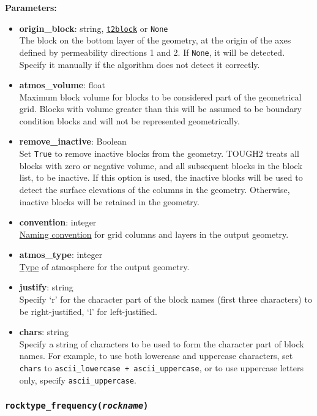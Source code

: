 \textbf{Parameters:}
\begin{itemize}
\item \textbf{origin\_block}: string, \hyperref[t2blockobjects]{\texttt{t2block}} or \texttt{None}\\
  The block on the bottom layer of the geometry, at the origin of the axes defined by permeability directions 1 and 2. If \texttt{None}, it will be detected. Specify it manually if the algorithm does not detect it correctly.
  \item \textbf{atmos\_volume}: float\\
    Maximum block volume for blocks to be considered part of the geometrical grid. Blocks with volume greater than this will be assumed to be boundary condition blocks and will not be represented geometrically.
  \item \textbf{remove\_inactive}: Boolean\\
    Set \texttt{True} to remove inactive blocks from the geometry. TOUGH2 treats all blocks with zero or negative volume, and all subsequent blocks in the block list, to be inactive. If this option is used, the inactive blocks will be used to detect the surface elevations of the columns in the geometry. Otherwise, inactive blocks will be retained in the geometry.
\item \textbf{convention}: integer\\
  \hyperref[geometry_format_conventions]{Naming convention} for grid columns and layers in the output geometry.
\item \textbf{atmos\_type}: integer\\
  \hyperref[geometry_format_conventions]{Type} of atmosphere for the output geometry.
\item \textbf{justify}: string\\
  Specify `r' for the character part of the block names (first three characters) to be right-justified, `l' for left-justified.
\item \textbf{chars}: string\\
  Specify a string of characters to be used to form the character part of block names.  For example, to use both lowercase and uppercase characters, set \texttt{chars} to \texttt{ascii\_lowercase + ascii\_uppercase}, or to use uppercase letters only, specify \texttt{ascii\_uppercase}.

\end{itemize}

\begin{snugshade}
\subsubsection{\texttt{rocktype\_frequency(\emph{rockname})}}
\end{snugshade}
\label{sec:t2grid:rocktype_frequency}

